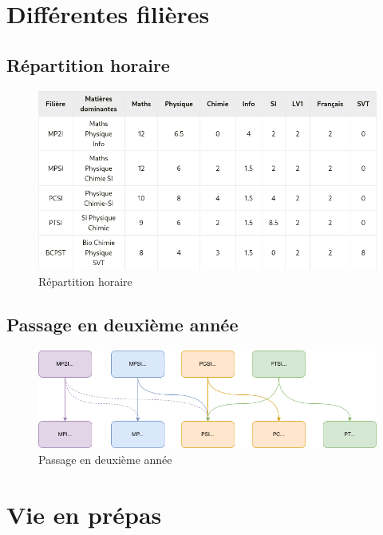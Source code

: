\documentclass{beamer}
\begin{document}
\section{Différentes filières}

\subsection{Répartition horaire}

\begin{frame}
    \begin{figure}
        \centering
        \includegraphics[width=\textwidth]{ressource_diapo/prepas.png}
        \caption{Répartition horaire}
    \end{figure}
\end{frame}

\subsection{Passage en deuxième année}

\begin{frame}
    \begin{figure}
        \centering
        \includegraphics[width=\textwidth]{ressource_diapo/deuxieme_annee.png}
        \caption{Passage en deuxième année}
    \end{figure}
\end{frame}

\section{Vie en prépas}
\end{document}
